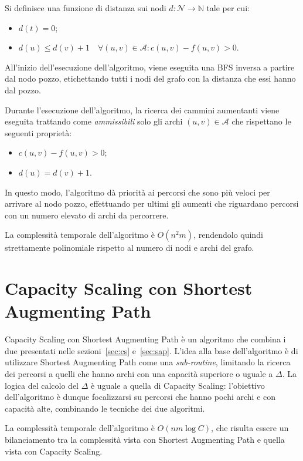 \documentclass[11pt]{report}
\newcommand{\set}[1]{\mathcal{#1}}
\begin{document}
    Si definisce una funzione di distanza sui nodi $d:\set N\to \mathbb{N}$ tale per cui:
    \begin{itemize}
        \item $d(t)=0$;
        \item $d(u)\le d(v)+1\quad\forall (u,v)\in \set A:c(u,v)-f(u,v)>0$.
    \end{itemize}

    All'inizio dell'esecuzione dell'algoritmo, viene eseguita una BFS inversa a partire dal nodo pozzo, etichettando tutti i nodi del grafo con la distanza che essi hanno dal pozzo.

    Durante l'esecuzione dell'algoritmo, la ricerca dei cammini aumentanti viene eseguita trattando come \textit{ammissibili} solo gli archi $(u,v)\in \set A$ che rispettano le seguenti proprietà:
    \begin{itemize}
        \item $c(u,v) - f(u,v) > 0$;
        \item $d(u) = d(v)+1$.
    \end{itemize}

    In questo modo, l'algoritmo dà priorità ai percorsi che sono più veloci per arrivare al nodo pozzo, effettuando per ultimi gli aumenti che riguardano percorsi con un numero elevato di archi da percorrere.

    La complessità temporale dell'algoritmo è $O(n^{2}m)$, rendendolo quindi strettamente polinomiale rispetto al numero di nodi e archi del grafo.

    \section{Capacity Scaling con Shortest Augmenting Path}\label{sec:cs_sap}
    Capacity Scaling con Shortest Augmenting Path è un algoritmo che combina i due presentati nelle sezioni~\ref{sec:cs} e~\ref{sec:sap}.
    L'idea alla base dell'algoritmo è di utilizzare Shortest Augmenting Path come una \textit{sub-routine}, limitando la ricerca dei percorsi a quelli che hanno archi con una capacità superiore o uguale a $\Delta$.
    La logica del calcolo del $\Delta$ è uguale a quella di Capacity Scaling: l'obiettivo dell'algoritmo è dunque focalizzarsi su percorsi che hanno pochi archi e con capacità alte, combinando le tecniche dei due algoritmi.

    La complessità temporale dell'algoritmo è $O(nm\log C)$, che risulta essere un bilanciamento tra la complessità vista con Shortest Augmenting Path e quella vista con Capacity Scaling.
\end{document}
